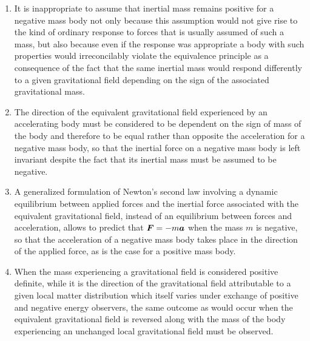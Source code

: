 \documentclass[notitlepage,12pt]{report}
\newcommand{\bm}[1]{\mbox{\boldmath $#1$}}
\begin{document}
\begin{enumerate}
\item It is inappropriate to assume that inertial mass remains positive for a negative mass body not only because this assumption would not give rise to the kind of ordinary response to forces that is usually assumed of such a mass, but also because even if the response was appropriate a body with such properties would irreconcilably violate the equivalence principle as a consequence of the fact that the same inertial mass would respond differently to a given gravitational field depending on the sign of the associated gravitational mass. 

\item The direction of the equivalent gravitational field experienced by an accelerating body must be considered to be dependent on the sign of mass of the body and therefore to be equal rather than opposite the acceleration for a negative mass body, so that the inertial force on a negative mass body is left invariant despite the fact that its inertial mass must be assumed to be negative.

\item A generalized formulation of Newton's second law involving a dynamic equilibrium between applied forces and the inertial force associated with the equivalent gravitational field, instead of an equilibrium between forces and acceleration, allows to predict that $\bm{F}=-m\bm{a}$ when the mass $m$ is negative, so that the acceleration of a negative mass body takes place in the direction of the applied force, as is the case for a positive mass body.

\item When the mass experiencing a gravitational field is considered positive definite, while it is the direction of the gravitational field attributable to a given local matter distribution which itself varies under exchange of positive and negative energy observers, the same outcome as would occur when the equivalent gravitational field is reversed along with the mass of the body experiencing an unchanged local gravitational field must be observed.


\end{enumerate}
\end{document}

